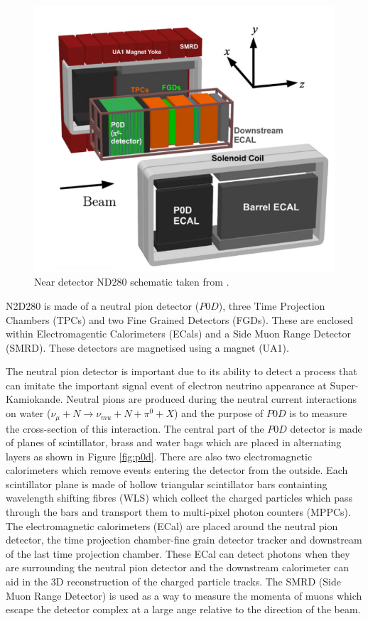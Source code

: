 \begin{figure}
    \includegraphics[width=\textwidth]{Figures/nd280_complex.png}
    \caption{Near detector ND280 schematic taken from \cite{t2kcollaborationT2KExperiment2011}.}
    \label{fig:ND280_schematic}
\end{figure}

N2D280 is made of a neutral pion detector ($P0D$), three Time Projection Chambers (TPCs) and two Fine Grained Detectors (FGDs). These are enclosed within Electromagentic Calorimeters (ECals) and a Side Muon Range Detector (SMRD). These detectors are magnetised using a magnet (UA1). 

The neutral pion detector is important due to its ability to detect a process that can imitate the important signal event of electron neutrino appearance at Super-Kamiokande. Neutral pions are produced during the neutral current interactions on water ($\nu_{\mu} + N \rightarrow \nu_{mu} + N +\pi^{0} + X$) and the purpose of $P0D$ is to measure the cross-section of this interaction. The central part of the $P0D$ detector is made of planes of scintillator, brass and water bags which are placed in alternating layers as shown in Figure \ref{fig:p0d}. There are also two electromagnetic calorimeters which remove events entering the detector from the outside.  Each scintillator plane is made of hollow triangular scintillator bars containting wavelength shifting fibres (WLS) which collect the charged particles which pass through the bars and transport them to multi-pixel photon counters (MPPCs). The electromagnetic calorimeters (ECal) are placed around the neutral pion detector, the time projection chamber-fine grain detector tracker and downstream of the last time projection chamber. These ECal can detect photons when they are surrounding the neutral pion detector and the downstream calorimeter can aid in the 3D reconstruction of the charged particle tracks. The SMRD (Side Muon Range Detector) is used as a way to measure the momenta of muons which escape the detector complex at a large ange relative to the direction of the beam.

